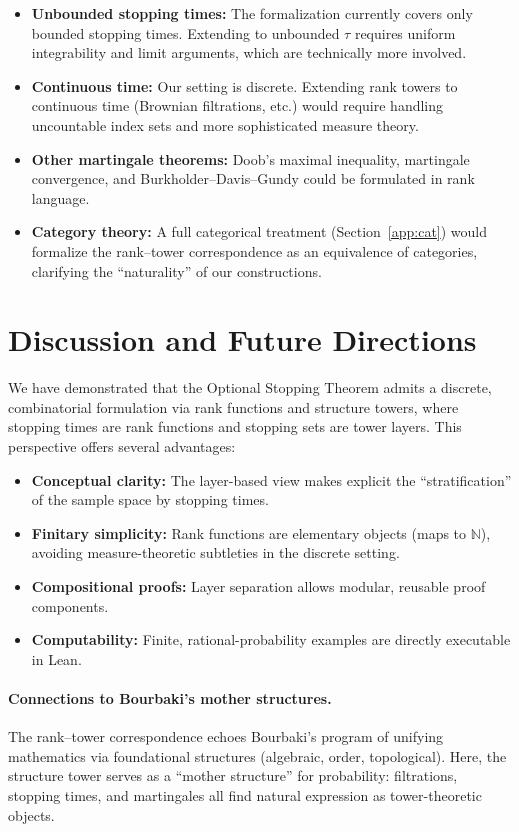 \documentclass[11pt]{article}
\theoremstyle{definition}
\theoremstyle{remark}
\newcommand{\NN}{\mathbb{N}}
\begin{document}
\begin{itemize}
\item \textbf{Unbounded stopping times:} The formalization currently covers only bounded stopping times.
  Extending to unbounded $\tau$ requires uniform integrability and limit arguments, which are technically more involved.
\item \textbf{Continuous time:} Our setting is discrete.
  Extending rank towers to continuous time (Brownian filtrations, etc.) would require handling uncountable index sets and more sophisticated measure theory.
\item \textbf{Other martingale theorems:} Doob's maximal inequality, martingale convergence, and Burkholder--Davis--Gundy could be formulated in rank language.
\item \textbf{Category theory:} A full categorical treatment (Section~\ref{app:cat}) would formalize the rank--tower correspondence as an equivalence of categories, clarifying the ``naturality'' of our constructions.
\end{itemize}

\section{Discussion and Future Directions}
\label{sec:discussion}

We have demonstrated that the Optional Stopping Theorem admits a discrete, combinatorial formulation via rank functions and structure towers, where stopping times are rank functions and stopping sets are tower layers.
This perspective offers several advantages:

\begin{itemize}
\item \textbf{Conceptual clarity:} The layer-based view makes explicit the ``stratification'' of the sample space by stopping times.
\item \textbf{Finitary simplicity:} Rank functions are elementary objects (maps to $\NN$), avoiding measure-theoretic subtleties in the discrete setting.
\item \textbf{Compositional proofs:} Layer separation allows modular, reusable proof components.
\item \textbf{Computability:} Finite, rational-probability examples are directly executable in Lean.
\end{itemize}

\paragraph{Connections to Bourbaki's mother structures.}
The rank--tower correspondence echoes Bourbaki's program of unifying mathematics via foundational structures (algebraic, order, topological).
Here, the structure tower serves as a ``mother structure'' for probability: filtrations, stopping times, and martingales all find natural expression as tower-theoretic objects.
\end{document}
